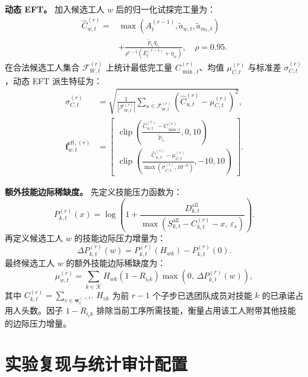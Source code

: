 \documentclass[journal,10pt]{IEEEtran}
\begin{document}
\textbf{动态 EFT。} 加入候选工人 $w$ 后的归一化试探完工量为：
\begin{equation}
\begin{aligned}
\widehat C_{w,t}^{(r)} ={}& \max\!\left(A_t^{(r-1)},\widetilde a_{w,t},\widetilde a_{m_t,t}\right) \\
&+ \frac{\widetilde p_{i_t}q_{i_t}}{\rho^{r-1}\left(E_t^{(r-1)}+\eta_w\right)}, \quad \rho=0.95.
\end{aligned}
\end{equation}
在合法候选工人集合 $\mathcal F_{W,t}^{(r)}$ 上统计最低完工量 $C_{\min,t}^{(r)}$、均值 $\mu_{C,t}^{(r)}$ 与标准差 $\sigma_{C,t}^{(r)}$，动态 EFT 派生特征为：
\begin{align}
\sigma_{C,t}^{(r)} &= \sqrt{\frac{1}{|\mathcal F_{W,t}^{(r)}|} \sum_{u\in\mathcal F_{W,t}^{(r)}} \left(\widehat C_{u,t}^{(r)}-\mu_{C,t}^{(r)}\right)^2}, \\
\mathbf f_{w,t}^{\mathrm{eft},(r)} &= \begin{bmatrix}
\operatorname{clip}\left(\frac{\widehat C_{w,t}^{(r)}-C_{\min,t}^{(r)}}{\widetilde p_{i_t}}, 0, 10\right) \\[6pt]
\operatorname{clip}\left(\frac{\widehat C_{w,t}^{(r)}-\mu_{C,t}^{(r)}}{\max(\sigma_{C,t}^{(r)}, 10^{-6})}, -10, 10\right)
\end{bmatrix}.
\end{align}

\textbf{额外技能边际稀缺度。} 先定义技能压力函数为：
\begin{equation}
P_{k,t}^{(r)}(x) = \log\!\left( 1+ \frac{D_{k,t}^{\mathrm{all}}} {\max\!\left( S_{k,t}^{\mathrm{all}}-C_{k,t}^{(r)}-x,\, \varepsilon_s \right)} \right).
\end{equation}
再定义候选工人 $w$ 的技能边际压力增量为：
\begin{equation}
\Delta P_{k,t}^{(r)}(w) = P_{k,t}^{(r)}(H_{wk}) - P_{k,t}^{(r)}(0).
\end{equation}
最终候选工人 $w$ 的额外技能边际稀缺度为：
\begin{equation}
\mu_{w,t}^{(r)} = \sum_{k\in\mathcal K} H_{wk}(1-R_{i_tk}) \max\!\left( 0,\, \Delta P_{k,t}^{(r)}(w) \right),
\end{equation}
其中 $C_{k,t}^{(r)} = \sum_{v\in\mathbf w_t^{(<r)}} H_{vk}$ 为前 $r-1$ 个子步已选团队成员对技能 $k$ 的已承诺占用人头数。因子 $1-R_{i_tk}$ 排除当前工序所需技能，衡量占用该工人附带其他技能的边际压力增量。

\section{实验复现与统计审计配置}\label{app:reproducibility}
\end{document}
